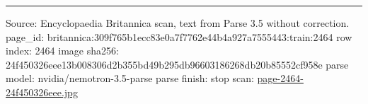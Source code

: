 \documentclass[10pt]{article}
\begin{document}
\vfill\par\noindent\rule{\linewidth}{0.4pt}\par
{\scriptsize\color{gray}\noindent Source: Encyclopaedia Britannica scan, text from Parse 3.5 without correction. page\_id: britannica:309f765b1ecc83e0a7f7762e44b4a927a7555443:train:2464 \quad row index: 2464 \quad image sha256: 24f450326eee13b008306d2b355bd49b295db96603186268db20b85552cf958e \quad parse model: nvidia/nemotron-3.5-parse \quad parse finish: stop \quad scan: \href{../scans/page-2464-24f450326eee.jpg}{page-2464-24f450326eee.jpg}\par}
\end{document}

